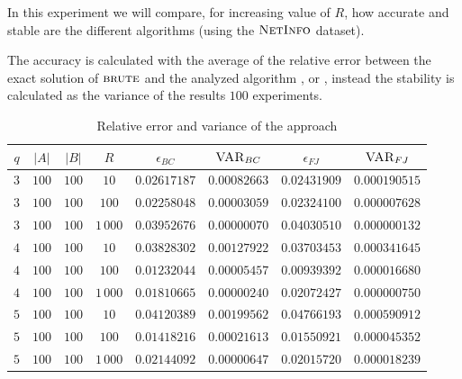 In this experiment we will compare, for increasing value of $R$, how accurate and stable are the different algorithms (using the $\textsc{NetInfo}$ dataset).\medskip

The accuracy is calculated with the average of the relative error between the exact solution of $\textsc{brute}$ and the analyzed algorithm \fcount, \fsamp or \base, instead the stability is calculated as the variance of the results $100$ experiments.

\begin{table}[h]
	\centering
	\begin{tabular}{|c|c|c|c|c|c|c|c|}
		\hline
		$q$ & $|A|$ & $|B|$ & $R$      & $\epsilon_{BC}$ & $\textsc{VAR}_{BC}$ & $\epsilon_{FJ}$ & $\textsc{VAR}_{FJ}$ \\ \hline \hline
		$3$ & $100$ & $100$ & $10$     & $0.02617187$    & $0.00082663$        & $0.02431909$    & $0.000190515$       \\ \hline
		$3$ & $100$ & $100$ & $100$    & $0.02258048$    & $0.00003059$        & $0.02324100$    & $0.000007628$       \\ \hline
		$3$ & $100$ & $100$ & $1\,000$ & $0.03952676$    & $0.00000070$        & $0.04030510$    & $0.000000132$       \\ \hline \hline
		$4$ & $100$ & $100$ & $10$     & $0.03828302$    & $0.00127922$        & $0.03703453$    & $0.000341645$       \\ \hline
		$4$ & $100$ & $100$ & $100$    & $0.01232044$    & $0.00005457$        & $0.00939392$    & $0.000016680$       \\ \hline
		$4$ & $100$ & $100$ & $1\,000$ & $0.01810665$    & $0.00000240$        & $0.02072427$    & $0.000000750$       \\ \hline \hline
		$5$ & $100$ & $100$ & $10$     & $0.04120389$    & $0.00199562$        & $0.04766193$    & $0.000590912$       \\ \hline
		$5$ & $100$ & $100$ & $100$    & $0.01418216$    & $0.00021613$        & $0.01550921$    & $0.000045352$       \\ \hline
		$5$ & $100$ & $100$ & $1\,000$ & $0.02144092$    & $0.00000647$        & $0.02015720$    & $0.000018239$       \\ \hline
		
	\end{tabular}
	\caption{Relative error and variance of the \fcount approach}	
\end{table}

